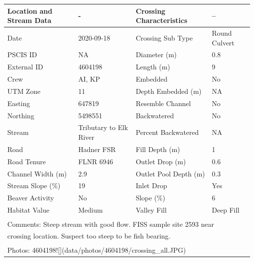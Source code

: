 \documentclass[
]{book}
\begin{document}
\begin{tabular}{l|l|l|l}
\hline
Location and Stream Data & - & Crossing Characteristics & --\\
\hline
Date & 2020-09-18 & Crossing Sub Type & Round Culvert\\
\hline
PSCIS ID & NA & Diameter (m) & 0.8\\
\hline
External ID & 4604198 & Length (m) & 9\\
\hline
Crew & AI, KP & Embedded & No\\
\hline
UTM Zone & 11 & Depth Embedded (m) & NA\\
\hline
Easting & 647819 & Resemble Channel & No\\
\hline
Northing & 5498551 & Backwatered & No\\
\hline
Stream & Tributary to Elk River & Percent Backwatered & NA\\
\hline
Road & Hadner FSR & Fill Depth (m) & 1\\
\hline
Road Tenure & FLNR 6946 & Outlet Drop (m) & 0.6\\
\hline
Channel Width (m) & 2.9 & Outlet Pool Depth (m) & 0.3\\
\hline
Stream Slope (\%) & 19 & Inlet Drop & Yes\\
\hline
Beaver Activity & No & Slope (\%) & 6\\
\hline
Habitat Value & Medium & Valley Fill & Deep Fill\\
\hline
\multicolumn{4}{l}{\textsuperscript{} Comments: Steep stream with good flow. FISS sample site 2593 near}\\
\multicolumn{4}{l}{crossing location. Suspect too steep to be fish bearing.}\\
\multicolumn{4}{l}{\textsuperscript{} Photos: 4604198![](data/photos/4604198/crossing\_all.JPG)}\\
\end{tabular}
\end{document}
